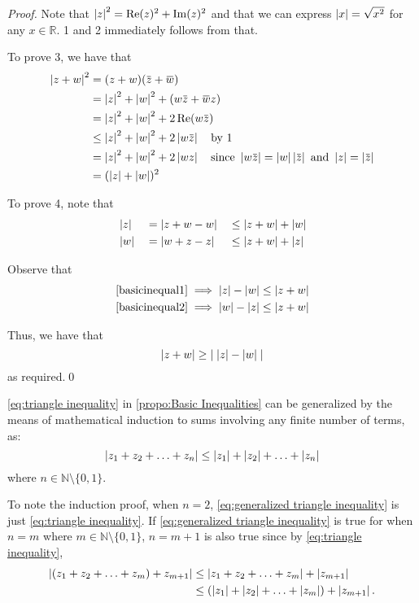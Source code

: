 \documentclass[11pt, oneside]{book}
\begin{document}
\begin{proof}
	Note that $\left|z\right|^2 = \operatorname{Re}(z)^2 + \operatorname{Im}(z)^2$ and that we can express $\left|x\right| = \sqrt{x^2}$ for any $x \in \mathbb{R} $. 1 and 2 immediately follows from that.

	To prove 3, we have that
	\begin{align*}
		\abs{z + w}^2 &= (z + w)(\bar{z} + \bar{w}) \\
				&= \abs{z}^2 + \abs{w}^2 + (w\bar{z} + \bar{w}z) \\
				&= \abs{z}^2 + \abs{w}^2 + 2\re(w\bar{z}) \\
				&\leq \abs{z}^2 + \abs{w}^2 + 2\abs{w\bar{z}} \quad \text{by 1} \\
				&= \abs{z}^2 + \abs{w}^2 + 2\abs{wz} \quad \text{since } \abs{w\bar{z}} = \abs{w}\abs{\bar{z}} \text{ and } \abs{z} = \abs{\bar{z}} \\
				&= (\abs{z} + \abs{w})^2
	\end{align*}
	
	To prove 4, note that
	\begin{alignat}{3}
		&\left|z\right| &&= \left|z + w - w\right| &&\leq \left|z + w\right| + \left|w\right| \label{basicinequal1} \\
		&\left|w\right| &&= \left|w + z - z\right| &&\leq \left|z + w\right| + \left|z\right| \label{basicinequal2}
	\end{alignat}

	Observe that
	\begin{align*}
		\cref{basicinequal1} \implies \abs{z} - \abs{w} \leq \abs{z + w} \\
		\cref{basicinequal2} \implies \abs{w} - \abs{z} \leq \abs{z + w}
	\end{align*}

	Thus, we have that
	\begin{equation*}
		\left|z + w\right| \geq \left|\; \left|z\right| - \left|w\right| \;\right|
	\end{equation*}
	as required.\qed
\end{proof}

\cref{eq:triangle inequality} in \cref{propo:Basic Inequalities} can be generalized by the means of mathematical induction to sums involving any finite number of terms, as:
\begin{equation}\label{eq:generalized triangle inequality}
	\left|z_1 + z_2 + \hdots + z_n\right| \leq \left|z_1\right| + \left|z_2\right| + \hdots + \left|z_n\right|
\end{equation}
where $n \in \mathbb{N} \setminus \{0, 1\}$.

To note the induction proof, when $n = 2$, \cref{eq:generalized triangle inequality} is just \cref{eq:triangle inequality}. If \cref{eq:generalized triangle inequality} is true for when $n = m$ where $m \in \mathbb{N} \setminus \{0, 1\}$, $n = m + 1$ is also true since by \cref{eq:triangle inequality},
\begin{align*}
	\left|(z_1 + z_2 + \hdots + z_m) + z_{m+1}\right| &\leq \left|z_1 + z_2 + \hdots + z_m\right| + \left|z_{m + 1}\right| \\
			&\leq (\left|z_1\right| + \left|z_2\right| + \hdots + \left|z_m\right|) + \left|z_{m+1}\right|.
\end{align*}
\end{document}
